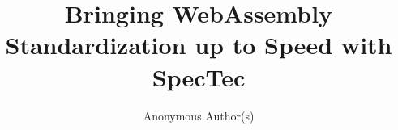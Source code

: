 \documentclass[acmsmall,review,screen]{acmart}
\begin{document}
\title{
Bringing WebAssembly Standardization up to Speed with SpecTec
}

\author{Anonymous Author(s)}

%
%
%


%

\maketitle






\balance

\end{document}

